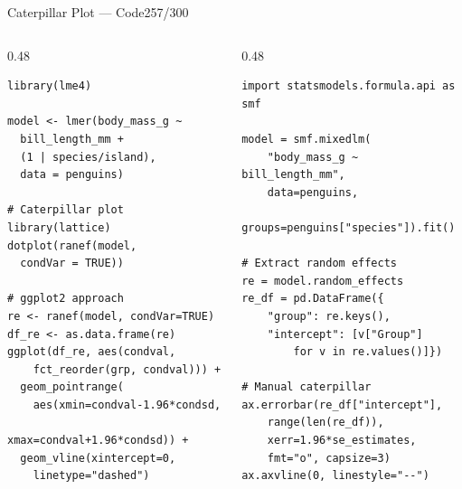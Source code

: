 \documentclass[10pt]{beamer}
\newcommand{\smark}[1]{\hfill{\scriptsize\color{codegray}#1}}
\begin{document}
\begin{frame}[fragile]{Caterpillar Plot --- Code}\smark{257/300}
\begin{columns}[T]
\begin{column}{0.48\textwidth}
\begin{lstlisting}[style=Rstyle]
library(lme4)

model <- lmer(body_mass_g ~
  bill_length_mm +
  (1 | species/island),
  data = penguins)

# Caterpillar plot
library(lattice)
dotplot(ranef(model,
  condVar = TRUE))

# ggplot2 approach
re <- ranef(model, condVar=TRUE)
df_re <- as.data.frame(re)
ggplot(df_re, aes(condval,
    fct_reorder(grp, condval))) +
  geom_pointrange(
    aes(xmin=condval-1.96*condsd,
        xmax=condval+1.96*condsd)) +
  geom_vline(xintercept=0,
    linetype="dashed")
\end{lstlisting}
\end{column}
\begin{column}{0.48\textwidth}
\begin{lstlisting}[style=Pystyle]
import statsmodels.formula.api as smf

model = smf.mixedlm(
    "body_mass_g ~ bill_length_mm",
    data=penguins,
    groups=penguins["species"]).fit()

# Extract random effects
re = model.random_effects
re_df = pd.DataFrame({
    "group": re.keys(),
    "intercept": [v["Group"]
        for v in re.values()]})

# Manual caterpillar
ax.errorbar(re_df["intercept"],
    range(len(re_df)),
    xerr=1.96*se_estimates,
    fmt="o", capsize=3)
ax.axvline(0, linestyle="--")
\end{lstlisting}
\end{column}
\end{columns}
\end{frame}
\end{document}

